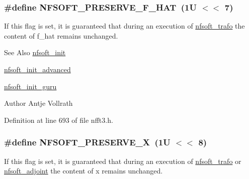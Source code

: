 \hypertarget{group__nfsoft_ga83119b0d4e62f7cd83e0f74c5ef08dec}{
\subsubsection[{N\-F\-S\-O\-F\-T\-\_\-\-P\-R\-E\-S\-E\-R\-V\-E\-\_\-\-F\-\_\-\-H\-A\-T}]{\setlength{\rightskip}{0pt plus 5cm}\#define N\-F\-S\-O\-F\-T\-\_\-\-P\-R\-E\-S\-E\-R\-V\-E\-\_\-\-F\-\_\-\-H\-A\-T~(1\-U $<$$<$ 7)}}\label{group__nfsoft_ga83119b0d4e62f7cd83e0f74c5ef08dec}
If this flag is set, it is guaranteed that during an execution of \hyperlink{group__nfsoft_gae243cd75d7571a99eae53818e32355fb}{nfsoft\-\_\-trafo} the content of {\ttfamily f\-\_\-hat} remains unchanged.

\begin{DoxySeeAlso}{See Also}
\hyperlink{group__nfsoft_ga31c884458165fa204073c6c16c10775e}{nfsoft\-\_\-init} 

\hyperlink{group__nfsoft_gaf4aec4ee2a2a5d56ca27c4f1a7f90b18}{nfsoft\-\_\-init\-\_\-advanced} 

\hyperlink{group__nfsoft_ga1c13cdd3f82f48fa41acdd313cdc2052}{nfsoft\-\_\-init\-\_\-guru} 
\end{DoxySeeAlso}
\begin{DoxyAuthor}{Author}
Antje Vollrath 
\end{DoxyAuthor}


Definition at line 693 of file nfft3.\-h.

\hypertarget{group__nfsoft_ga2650cbfde4c8259e5059d6e9b91e0ec3}{
\subsubsection[{N\-F\-S\-O\-F\-T\-\_\-\-P\-R\-E\-S\-E\-R\-V\-E\-\_\-\-X}]{\setlength{\rightskip}{0pt plus 5cm}\#define N\-F\-S\-O\-F\-T\-\_\-\-P\-R\-E\-S\-E\-R\-V\-E\-\_\-\-X~(1\-U $<$$<$ 8)}}\label{group__nfsoft_ga2650cbfde4c8259e5059d6e9b91e0ec3}
If this flag is set, it is guaranteed that during an execution of \hyperlink{group__nfsoft_gae243cd75d7571a99eae53818e32355fb}{nfsoft\-\_\-trafo} or \hyperlink{group__nfsoft_ga08395b1dd90f9a2565685d17460afc5b}{nfsoft\-\_\-adjoint} the content of {\ttfamily x} remains unchanged.

